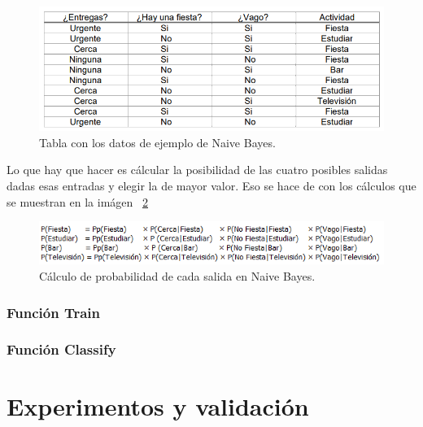 \documentclass[a4paper, 12pt]{book}
\begin{document}
\begin{figure}
	\centering
	\includegraphics[width=12cm, keepaspectratio]{img/tablabayes}
	\caption{Tabla con los datos de ejemplo de Naive Bayes.}			
	\label{fig:tablabayes}
\end{figure}

Lo que hay que hacer es cálcular la posibilidad de las cuatro posibles salidas dadas esas entradas y elegir la de mayor valor. Eso se hace de con los cálculos que se muestran en la imágen ~\ref{fig:probabilidadbayes}

\begin{figure}
	\centering
	\includegraphics[width=12cm, keepaspectratio]{img/probabilidadbayes}
	\caption{Cálculo de probabilidad de cada salida en Naive Bayes.}			
	\label{fig:probabilidadbayes}
\end{figure}


\subsection{Función Train} 
\label{sec:funciontrainbayes}

\subsection{Función Classify} 
\label{sec:funcionclassifybayes}


\cleardoublepage
\chapter{Experimentos y validación}
\end{document}

